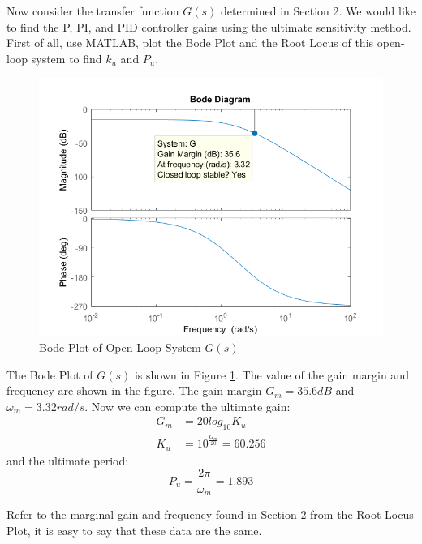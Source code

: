 \documentclass[a4paper, twocolumn, titlepage, 10pt]{article}
\begin{document}
	Now consider the transfer function $G(s)$ determined in Section 2. We would like to find the P, PI, and PID controller gains using the ultimate sensitivity method. First of all, use MATLAB, plot the Bode Plot and the Root Locus of this open-loop system to find $k_u$ and $P_u$. 
	\begin{figure}[H]
		\centering
		\includegraphics[width=\linewidth]{bode}
		\caption{Bode Plot of Open-Loop System $G(s)$}
		\label{bode}
	\end{figure}
	The Bode Plot of $G(s)$ is shown in Figure \ref{bode}. The value of the gain margin and frequency are shown in the figure. The gain margin $G_m = 35.6dB$ and $\omega _m = 3.32rad/s$. Now we can compute the ultimate gain:
	\begin{align*}
		G_m &= 20log_{10}K_u \\
		K_u &=  10^{\frac{G_m}{20}} = 60.256
	\end{align*}
	and the ultimate period:
	$$
		P_u = \frac{2\pi}{\omega_m} = 1.893
	$$
	
	Refer to the marginal gain and frequency found in Section 2 from the Root-Locus Plot, it is easy to say that these data are the same. 
	
\end{document}
